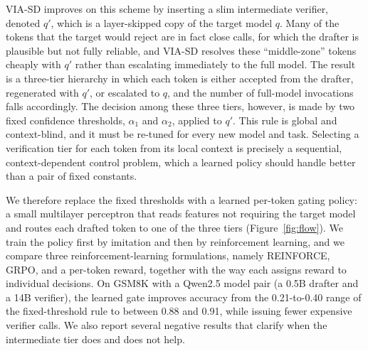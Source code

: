 \documentclass[11pt]{article}
\begin{document}
VIA-SD improves on this scheme by inserting a slim intermediate verifier, denoted $q'$, which is a
layer-skipped copy of the target model $q$. Many of the tokens that the target would reject are in fact
close calls, for which the drafter is plausible but not fully reliable, and VIA-SD resolves these
``middle-zone'' tokens cheaply with $q'$ rather than escalating immediately to the full model. The
result is a three-tier hierarchy in which each token is either accepted from the drafter, regenerated
with $q'$, or escalated to $q$, and the number of full-model invocations falls accordingly. The
decision among these three tiers, however, is made by two fixed confidence thresholds, $\alpha_1$ and
$\alpha_2$, applied to $q'$. This rule is global and context-blind, and it must be re-tuned for every
new model and task. Selecting a verification tier for each token from its local context is precisely a
sequential, context-dependent control problem, which a learned policy should handle better than a pair
of fixed constants.

We therefore replace the fixed thresholds with a learned per-token gating policy: a small multilayer
perceptron that reads features not requiring the target model and routes each drafted token to one of
the three tiers (Figure~\ref{fig:flow}). We train the policy first by imitation and then by
reinforcement learning, and we compare three reinforcement-learning formulations, namely REINFORCE,
GRPO, and a per-token reward, together with the way each assigns reward to individual decisions. On
GSM8K with a Qwen2.5 model pair (a 0.5B drafter and a 14B verifier), the learned gate improves accuracy
from the 0.21-to-0.40 range of the fixed-threshold rule to between 0.88 and 0.91, while issuing fewer
expensive verifier calls. We also report several negative results that clarify when the intermediate
tier does and does not help.
\end{document}

